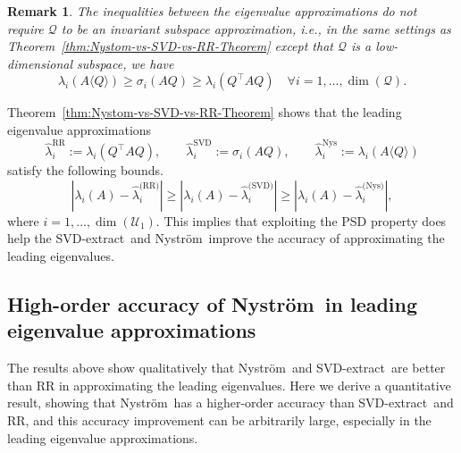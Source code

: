 \documentclass[onefignum,onetabnum]{siamart251216}
\def\subspace{\mathcal{Q}}
\def\Nystrom{Nystr{\"o}m}
\def\svdmethod{SVD-extract}
\def\leadingsubspace{\mathcal{U}_1}
\newtheorem{remark}{{\sc Remark}}[section]
\begin{document}
\begin{remark}
    The inequalities between the eigenvalue approximations do not require $\subspace$ to be an invariant subspace approximation, i.e., in the same settings as Theorem~\ref{thm:Nystom-vs-SVD-vs-RR-Theorem} except that $\mathcal{Q}$ is a low-dimensional subspace, we have
    \begin{equation}
        \label{remark:Nystrom-vs-SVD-vs-RR-general-form}
        \lambda_i(A\langle Q \rangle) \geq \sigma_i(AQ) \geq \lambda_i(Q^\top A Q) \quad \forall i = 1, ... ,\dim(\subspace).
    \end{equation}
\end{remark}
Theorem~\ref{thm:Nystom-vs-SVD-vs-RR-Theorem} shows that the leading eigenvalue approximations
\[
\hat{\lambda}_{i}^{\mathrm{RR}}
    := \lambda_i(Q^\top A Q), 
\qquad
\hat{\lambda}_{i}^{\mathrm{SVD}}
    := \sigma_i(AQ),
\qquad
\hat{\lambda}_{i}^{\mathrm{Nys}}
    := \lambda_i(A\langle Q\rangle)
\]
satisfy the following bounds.
\begin{equation}
    \label{eq:largest-eigenvalue-accuracy-relation}
    \left| \lambda_{i}(A) - \hat{\lambda}_{i}^{\text{(RR)}}\right| 
    \geq
    \left| \lambda_{i}(A) - \hat{\lambda}_{i}^{\text{(SVD)}}\right|
    \geq
    \left| \lambda_{i}(A) - \hat{\lambda}_{i}^{\text{(Nys)}}\right|,
\end{equation}
where $i = 1, ..., \dim(\leadingsubspace)$. This implies that exploiting the PSD property does help the \svdmethod\ and \Nystrom\ improve the accuracy of approximating the leading eigenvalues.


\subsection{High-order accuracy of \Nystrom\ in leading eigenvalue approximations}
\label{subsec:Analysis-High-order-accuracy-Nystrom}
The results above show qualitatively that \Nystrom\ and \svdmethod\ are better than RR in approximating the leading eigenvalues. Here we derive a quantitative result, showing that \Nystrom\ has a higher-order accuracy than \svdmethod\, and RR, and this accuracy improvement can be arbitrarily large, especially in the leading eigenvalue approximations.
\end{document}
